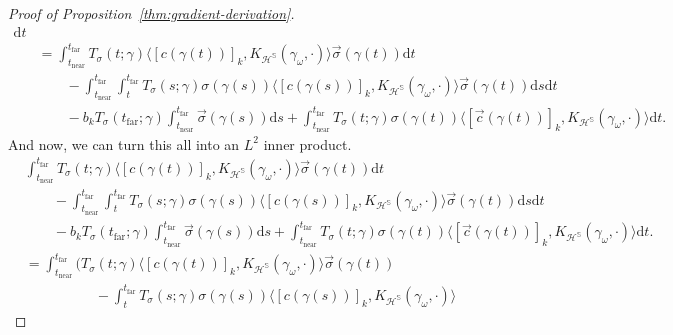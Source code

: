 \documentclass{article}
\newcommand{\dif}{\mathrm{d}}
\newcommand{\near}{\mathrm{near}}
\newcommand{\far}{\mathrm{far}}
\begin{document}
\begin{proof}[Proof of Proposition~\ref{thm:gradient-derivation}]
{\begin{align*}
            \dif t
        \\ &=
            \int_{t_\near}^{t_\far}
                T_{\sigma}(t;\gamma)
                \langle [c(\gamma(t))]_k, K_{\mathcal{H}^\mathbb{S}}(\gamma_\omega, \cdot) \rangle \vec{\sigma}(\gamma(t))
            \dif t
            \\ &\qquad - \int_{t_\near}^{t_\far} \int_{t}^{t_\far}
                T_{\sigma}(s;\gamma)
                \sigma(\gamma(s))
                \langle [c(\gamma(s))]_k, K_{\mathcal{H}^\mathbb{S}}(\gamma_\omega, \cdot) \rangle
                \vec{\sigma}(\gamma(t))
            \dif s \dif t
            \\ &\qquad - b_k T_{\sigma}(t_\far;\gamma) \int_{t_\near}^{t_\far} \vec{\sigma}(\gamma(s)) \dif s
            + \int_{t_\near}^{t_\far}
                T_{\sigma}(t;\gamma)
                \sigma(\gamma(t)) \langle [\vec{c}(\gamma(t))]_k, K_{\mathcal{H}^\mathbb{S}}(\gamma_\omega, \cdot) \rangle
            \dif t.
    \end{align*}
    }
    And now, we can turn this all into an $L^2$ inner product.
    {\small
    \begin{align*}
        &
            \int_{t_\near}^{t_\far}
                T_{\sigma}(t;\gamma)
                \langle [c(\gamma(t))]_k, K_{\mathcal{H}^\mathbb{S}}(\gamma_\omega, \cdot) \rangle \vec{\sigma}(\gamma(t))
            \dif t
            \\ &\qquad - \int_{t_\near}^{t_\far} \int_{t}^{t_\far}
                T_{\sigma}(s;\gamma)
                \sigma(\gamma(s))
                \langle [c(\gamma(s))]_k, K_{\mathcal{H}^\mathbb{S}}(\gamma_\omega, \cdot) \rangle
                \vec{\sigma}(\gamma(t))
            \dif s \dif t
            \\ &\qquad - b_k T_{\sigma}(t_\far;\gamma) \int_{t_\near}^{t_\far} \vec{\sigma}(\gamma(s)) \dif s
            + \int_{t_\near}^{t_\far}
                T_{\sigma}(t;\gamma)
                \sigma(\gamma(t)) \langle [\vec{c}(\gamma(t))]_k, K_{\mathcal{H}^\mathbb{S}}(\gamma_\omega, \cdot) \rangle
            \dif t.
        \\ &=
            \int_{t_\near}^{t_\far} \Biggl(
                T_{\sigma}(t;\gamma)
                \langle [c(\gamma(t))]_k, K_{\mathcal{H}^\mathbb{S}}(\gamma_\omega, \cdot) \rangle \vec{\sigma}(\gamma(t))
                \\ &\qquad\qquad\quad - \int_{t}^{t_\far} T_{\sigma}(s;\gamma)
                \sigma(\gamma(s))
                \langle [c(\gamma(s))]_k, K_{\mathcal{H}^\mathbb{S}}(\gamma_\omega, \cdot) \rangle

\end{align*}}
\end{proof}
\end{document}
